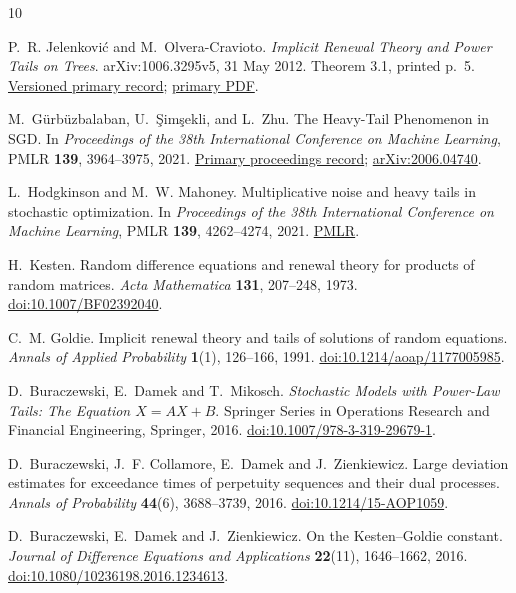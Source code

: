 \documentclass[11pt,a4paper]{article}
\numberwithin{equation}{section}
\theoremstyle{remark}
\begin{document}
\begin{thebibliography}{10}
\raggedright
{}

P.~R. Jelenkovi\'c and M.~Olvera-Cravioto.
\emph{Implicit Renewal Theory and Power Tails on Trees}.
arXiv:1006.3295v5, 31 May 2012.
Theorem 3.1, printed p.~5.
\href{https://arxiv.org/abs/1006.3295v5}{Versioned primary record};
\href{https://arxiv.org/pdf/1006.3295}{primary PDF}.

M.~G\"urb\"uzbalaban, U.~\c{S}im\c{s}ekli, and L.~Zhu.
The Heavy-Tail Phenomenon in SGD.
In \emph{Proceedings of the 38th International Conference on Machine
Learning}, PMLR \textbf{139}, 3964--3975, 2021.
\href{https://proceedings.mlr.press/v139/gurbuzbalaban21a.html}
{Primary proceedings record};
\href{https://arxiv.org/abs/2006.04740}{arXiv:2006.04740}.

L.~Hodgkinson and M.~W. Mahoney.
Multiplicative noise and heavy tails in stochastic optimization.
In \emph{Proceedings of the 38th International Conference on Machine
Learning}, PMLR \textbf{139}, 4262--4274, 2021.
\href{https://proceedings.mlr.press/v139/hodgkinson21a.html}{PMLR}.

H.~Kesten.
Random difference equations and renewal theory for products of random
matrices.
\emph{Acta Mathematica} \textbf{131}, 207--248, 1973.
\href{https://doi.org/10.1007/BF02392040}{doi:10.1007/BF02392040}.

C.~M. Goldie.
Implicit renewal theory and tails of solutions of random equations.
\emph{Annals of Applied Probability} \textbf{1}(1), 126--166, 1991.
\href{https://doi.org/10.1214/aoap/1177005985}{doi:10.1214/aoap/1177005985}.

D.~Buraczewski, E.~Damek and T.~Mikosch.
\emph{Stochastic Models with Power-Law Tails: The Equation $X=AX+B$}.
Springer Series in Operations Research and Financial Engineering,
Springer, 2016.
\href{https://doi.org/10.1007/978-3-319-29679-1}{doi:10.1007/978-3-319-29679-1}.

D.~Buraczewski, J.~F. Collamore, E.~Damek and J.~Zienkiewicz.
Large deviation estimates for exceedance times of perpetuity sequences
and their dual processes. \emph{Annals of Probability}
\textbf{44}(6), 3688--3739, 2016.
\href{https://doi.org/10.1214/15-AOP1059}{doi:10.1214/15-AOP1059}.


D.~Buraczewski, E.~Damek and J.~Zienkiewicz.
On the Kesten--Goldie constant.
\emph{Journal of Difference Equations and Applications}
\textbf{22}(11), 1646--1662, 2016.
\href{https://doi.org/10.1080/10236198.2016.1234613}{doi:10.1080/10236198.2016.1234613}.


\end{thebibliography}
\end{document}
